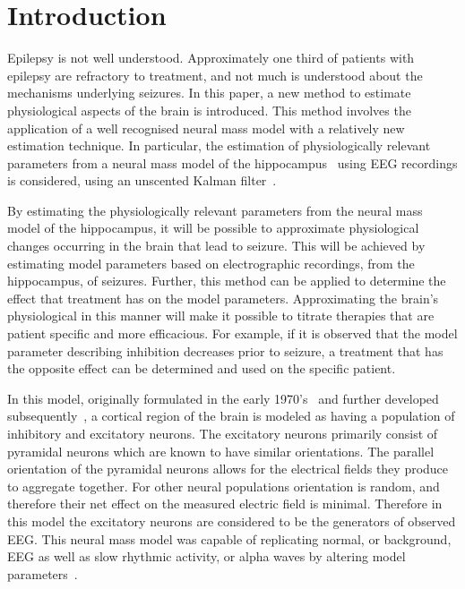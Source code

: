 \section{Introduction}


Epilepsy is not well understood. Approximately one third of patients with epilepsy are refractory to treatment, and not much is understood about the mechanisms underlying seizures. In this paper, a new method to estimate physiological aspects of the brain is introduced. This method involves the application of a well recognised neural mass model with a relatively new estimation technique. In particular, the estimation of physiologically relevant parameters from a neural mass model of the hippocampus~\citep{wendling2002epileptic} using EEG recordings is considered, using an unscented Kalman filter~\citep{voss2004nonlinear}. 

By estimating the physiologically relevant parameters from the neural mass model of the hippocampus, it will be possible to approximate physiological changes occurring in the brain that lead to seizure. This will be achieved by estimating model parameters based on electrographic recordings, from the hippocampus, of seizures. Further, this method can be applied to determine the effect that treatment has on the model parameters. Approximating the brain's physiological in this manner will make it possible to titrate therapies that are patient specific and more efficacious. For example, if it is observed that the model parameter describing inhibition decreases prior to seizure, a treatment that has the opposite effect can be determined and used on the specific patient.


In this model, originally formulated in the early 1970's~\citep{wilson1973mathematical,lopes1974model,freeman1963electrical} and further developed subsequently~\citep{jansen1995electroencephalogram}, a cortical region of the brain is modeled as having a population of inhibitory and excitatory neurons. The excitatory neurons primarily consist of pyramidal neurons which are known to have similar orientations. The parallel orientation of the pyramidal neurons allows for the electrical fields they produce to aggregate together. For other neural populations orientation is random, and therefore their net effect on the measured electric field is minimal. Therefore in this model the excitatory neurons are considered to be the generators of observed EEG. This neural mass model was capable of replicating normal, or background, EEG as well as slow rhythmic activity, or alpha waves by altering model parameters~\citep{jansen1995electroencephalogram}.

